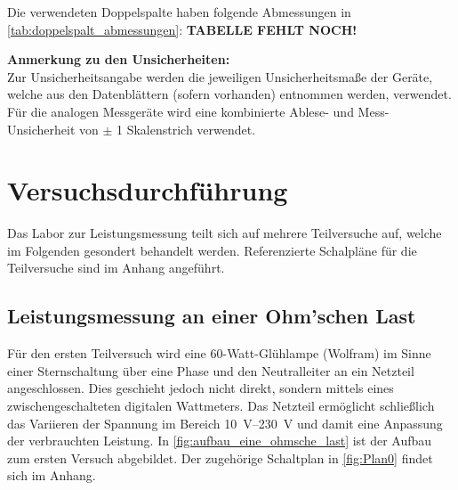 \documentclass[ngerman]{scrartcl}
\begin{document}
Die verwendeten Doppelspalte haben folgende Abmessungen in \autoref{tab:doppelspalt_abmessungen}:
\textbf{TABELLE FEHLT NOCH!}

\textbf{Anmerkung zu den Unsicherheiten:}\\
Zur Unsicherheitsangabe werden die jeweiligen Unsicherheitsmaße der Geräte, welche aus den Datenblättern (sofern vorhanden) entnommen werden, verwendet. Für die analogen Messgeräte wird eine kombinierte Ablese- und Mess-Unsicherheit von $\pm$ 1 Skalenstrich verwendet.



\section{Versuchsdurchführung}
\label{sec:versuchsdurchfuehrung}

Das Labor zur Leistungsmessung teilt sich auf mehrere Teilversuche auf, welche im Folgenden gesondert behandelt werden. Referenzierte Schalpläne für die Teilversuche sind im Anhang angeführt.

\subsection{Leistungsmessung an einer Ohm'schen Last}
\label{subsec:durchf_versuch1}

Für den ersten Teilversuch wird eine 60-Watt-Glühlampe (Wolfram) im Sinne einer Sternschaltung über eine Phase und den Neutralleiter an ein Netzteil angeschlossen. Dies geschieht jedoch nicht direkt, sondern mittels eines zwischengeschalteten digitalen Wattmeters. Das Netzteil ermöglicht schließlich das Variieren der Spannung im Bereich \SIrange{10}{230}{\volt} und damit eine Anpassung der verbrauchten Leistung. In \autoref{fig:aufbau_eine_ohmsche_last} ist der Aufbau zum ersten Versuch abgebildet. Der zugehörige Schaltplan in \autoref{fig:Plan0} findet sich im Anhang.
\end{document}
